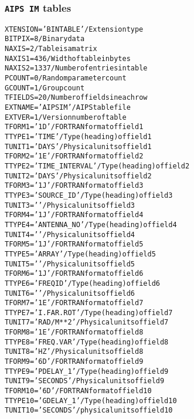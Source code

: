 \documentclass[twoside]{article}
\begin{document}
\subsubsection{{\tt AIPS IM} tables}
\label{Appe:IMtable}
\begin{alltt}
XTENSION= 'BINTABLE'           / Extension type
BITPIX  =                    8 / Binary data
NAXIS   =                    2 / Table is a matrix
NAXIS1  =                  436 / Width of table in bytes
NAXIS2  =                 1337 / Number of entries in table
PCOUNT  =                    0 / Random parameter count
GCOUNT  =                    1 / Group count
TFIELDS =                   20 / Number of fields in each row
EXTNAME = 'AIPS IM '           / AIPS table file
EXTVER  =                    1 / Version number of table
TFORM1  = '1D      '           / FORTRAN format of field  1
TTYPE1  = 'TIME            '   / Type (heading) of field  1
TUNIT1  = 'DAYS    '           / Physical units of field  1
TFORM2  = '1E      '           / FORTRAN format of field  2
TTYPE2  = 'TIME_INTERVAL   '   / Type (heading) of field  2
TUNIT2  = 'DAYS    '           / Physical units of field  2
TFORM3  = '1J      '           / FORTRAN format of field  3
TTYPE3  = 'SOURCE_ID       '   / Type (heading) of field  3
TUNIT3  = '        '           / Physical units of field  3
TFORM4  = '1J      '           / FORTRAN format of field  4
TTYPE4  = 'ANTENNA_NO      '   / Type (heading) of field  4
TUNIT4  = '        '           / Physical units of field  4
TFORM5  = '1J      '           / FORTRAN format of field  5
TTYPE5  = 'ARRAY           '   / Type (heading) of field  5
TUNIT5  = '        '           / Physical units of field  5
TFORM6  = '1J      '           / FORTRAN format of field  6
TTYPE6  = 'FREQID          '   / Type (heading) of field  6
TUNIT6  = '        '           / Physical units of field  6
TFORM7  = '1E      '           / FORTRAN format of field  7
TTYPE7  = 'I.FAR.ROT       '   / Type (heading) of field  7
TUNIT7  = 'RAD/M**2'           / Physical units of field  7
TFORM8  = '1E      '           / FORTRAN format of field  8
TTYPE8  = 'FREQ.VAR        '   / Type (heading) of field  8
TUNIT8  = 'HZ      '           / Physical units of field  8
TFORM9  = '6D      '           / FORTRAN format of field  9
TTYPE9  = 'PDELAY_1        '   / Type (heading) of field  9
TUNIT9  = 'SECONDS '           / Physical units of field  9
TFORM10 = '6D      '           / FORTRAN format of field 10
TTYPE10 = 'GDELAY_1        '   / Type (heading) of field 10
TUNIT10 = 'SECONDS '           / physical units of field 10

\end{alltt}
\end{document}
